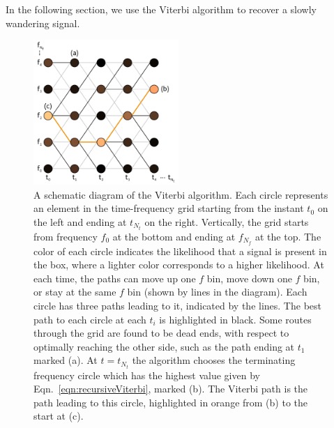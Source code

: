 \documentclass[paper-main.tex]{subfiles}
\begin{document}
In the following section, we use the Viterbi algorithm to recover a slowly wandering signal.



\begin{figure}
\includegraphics[width=0.49\textwidth]{figures/viterbiDiagram.pdf}
\caption{\label{fig:viterbi}
A schematic diagram of the Viterbi algorithm. 
Each circle represents an element in the time-frequency grid starting from the instant $t_0$ on the left and ending at $t_{N_t}$ on the right. 
Vertically, the grid starts from frequency $f_0$ at the bottom and ending at $f_{N_f}$ at the top. 
The color of each circle indicates the likelihood that a signal is present in the box, where a lighter color corresponds to a higher likelihood. 
At each time, the paths can move up one $f$ bin, move down one $f$ bin, or stay at the same $f$ bin (shown by lines in the diagram). 
Each circle has three paths leading to it, indicated by the lines. 
The best path to each circle at each $t_i$ is highlighted in black. 
Some routes through the grid are found to be dead ends, with respect to optimally reaching the other side, such as the path ending at $t_1$ marked (a). 
At $t=t_{N_t}$ the algorithm chooses the terminating frequency circle which has the highest value given by Eqn.~\ref{eqn:recursiveViterbi}, marked (b). 
The Viterbi path is the path leading to this circle, highlighted in orange from (b) to the start at (c). 
}
\end{figure}
\end{document}

